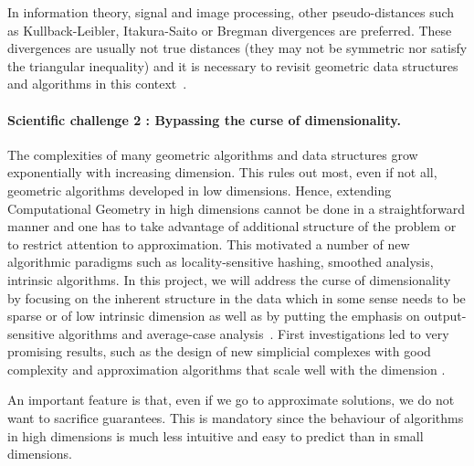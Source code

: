 In information theory, signal and image processing, other pseudo-distances such as Kullback-Leibler, Itakura-Saito or Bregman divergences are preferred.  
These divergences are usually not true distances (they may not be symmetric nor satisfy the triangular inequality) and it is necessary to revisit geometric data structures and algorithms in this context~\cite{geometrica-6154a}.




\paragraph{Scientific challenge 2 :  Bypassing the curse of dimensionality.} 

The complexities of many geometric algorithms and data structures grow exponentially with increasing dimension. %
This rules out most, even if not all, geometric algorithms developed in low dimensions.  Hence, extending Computational Geometry in high dimensions cannot be done in a straightforward manner and one has to take advantage of additional structure of the problem or to restrict attention to approximation. This motivated a number of new algorithmic paradigms such as locality-sensitive hashing, smoothed analysis, intrinsic algorithms.  In this project, we will address the curse of dimensionality by focusing on the inherent structure in the data which in some sense needs to be sparse or of low intrinsic dimension as well as by putting the emphasis on output-sensitive algorithms and average-case analysis~\cite{sl-mwp-2000}.  
First investigations led to very promising results, such as the design of new simplicial complexes with good complexity and approximation algorithms that scale well with the dimension \cite{cds-tewc-2004,geometrica-7142i}.


An important feature is that, even if we go to approximate solutions, we do not want to sacrifice guarantees. This is mandatory since the behaviour of algorithms in high dimensions is much less intuitive and easy to predict than in small dimensions. %





